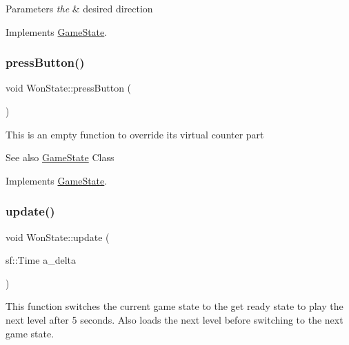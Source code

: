 \begin{DoxyParams}{Parameters}
{\em the} & desired direction \\
\hline
\end{DoxyParams}


Implements \hyperlink{class_game_state_aaae8c1b3ae6969eb2dd81bfc12fbf43f}{Game\+State}.

\mbox{\label{class_won_state_ab17f101d9ab90e60259e28b8775a76ec}} 
\subsubsection{\texorpdfstring{press\+Button()}{pressButton()}}
{\footnotesize\ttfamily void Won\+State\+::press\+Button (\begin{DoxyParamCaption}{ }\end{DoxyParamCaption})\hspace{0.3cm}{\ttfamily [virtual]}}

This is an empty function to override it\textquotesingle{}s virtual counter part \begin{DoxySeeAlso}{See also}
\hyperlink{class_game_state}{Game\+State} Class 
\end{DoxySeeAlso}


Implements \hyperlink{class_game_state_aa14eeaf244bcf19b7013af75cb722dde}{Game\+State}.

\mbox{\label{class_won_state_a0ea91513e3df2eafbe8ef7b9810eaff1}} 
\subsubsection{\texorpdfstring{update()}{update()}}
{\footnotesize\ttfamily void Won\+State\+::update (\begin{DoxyParamCaption}\item[{sf\+::\+Time}]{a\+\_\+delta }\end{DoxyParamCaption})\hspace{0.3cm}{\ttfamily [virtual]}}

This function switches the current game state to the get ready state to play the next level after 5 seconds. Also loads the next level before switching to the next game state.


